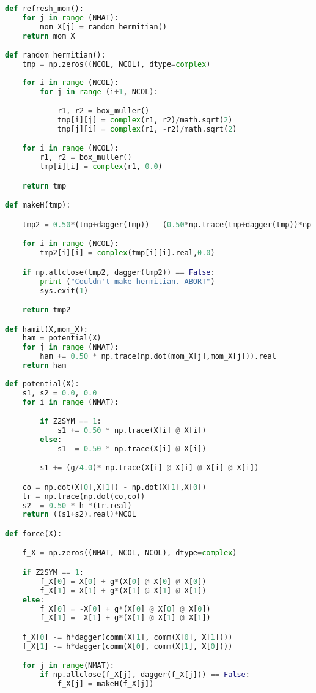 \begin{footnotesize}
\begin{lstlisting}[language=Python]
def refresh_mom():
    for j in range (NMAT):
        mom_X[j] = random_hermitian()
    return mom_X

def random_hermitian(): 
    tmp = np.zeros((NCOL, NCOL), dtype=complex)
 
    for i in range (NCOL):
        for j in range (i+1, NCOL): 

            r1, r2 = box_muller()
            tmp[i][j] = complex(r1, r2)/math.sqrt(2)
            tmp[j][i] = complex(r1, -r2)/math.sqrt(2)

    for i in range (NCOL):
        r1, r2 = box_muller()
        tmp[i][i] = complex(r1, 0.0)

    return tmp

def makeH(tmp):

    tmp2 = 0.50*(tmp+dagger(tmp)) - (0.50*np.trace(tmp+dagger(tmp))*np.eye(NCOL))/NCOL

    for i in range (NCOL):
        tmp2[i][i] = complex(tmp[i][i].real,0.0)

    if np.allclose(tmp2, dagger(tmp2)) == False:
        print ("Couldn't make hermitian. ABORT")
        sys.exit(1)

    return tmp2

def hamil(X,mom_X):
    ham = potential(X)
    for j in range (NMAT):
        ham += 0.50 * np.trace(np.dot(mom_X[j],mom_X[j])).real
    return ham
         
def potential(X):
    s1, s2 = 0.0, 0.0
    for i in range (NMAT):

        if Z2SYM == 1:
            s1 += 0.50 * np.trace(X[i] @ X[i]) 
        else:  
            s1 -= 0.50 * np.trace(X[i] @ X[i])

        s1 += (g/4.0)* np.trace(X[i] @ X[i] @ X[i] @ X[i])

    co = np.dot(X[0],X[1]) - np.dot(X[1],X[0])
    tr = np.trace(np.dot(co,co))
    s2 -= 0.50 * h *(tr.real)
    return ((s1+s2).real)*NCOL

def force(X):

    f_X = np.zeros((NMAT, NCOL, NCOL), dtype=complex)

    if Z2SYM == 1:
        f_X[0] = X[0] + g*(X[0] @ X[0] @ X[0])
        f_X[1] = X[1] + g*(X[1] @ X[1] @ X[1])
    else: 
        f_X[0] = -X[0] + g*(X[0] @ X[0] @ X[0])
        f_X[1] = -X[1] + g*(X[1] @ X[1] @ X[1])

    f_X[0] -= h*dagger(comm(X[1], comm(X[0], X[1])))
    f_X[1] -= h*dagger(comm(X[0], comm(X[1], X[0])))

    for j in range(NMAT):
        if np.allclose(f_X[j], dagger(f_X[j])) == False:
            f_X[j] = makeH(f_X[j])


\end{lstlisting}
\end{footnotesize}
